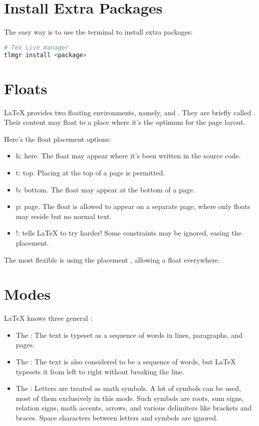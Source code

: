 \section{Install Extra Packages}
\label{sec:inst-extra-pack}

The easy way is to use the terminal to install extra packages:

\begin{lstlisting}[language=sh]
# Tex Live manager
tlmgr install <package>
\end{lstlisting}




\section{Floats}


\LaTeX\xspace provides two floating environments, namely,
 and . They are briefly called
. Their content may float to a place where it's the
optimum for the page layout.


Here's the float placement options:
\begin{itemize}
\item h: here. The float may appear where it's been written in the source code.
\item t: top. Placing at the top of a page is permitted.
\item b: bottom. The float may appear at the bottom of a page.
\item p: page. The float is allowed to appear on a separate page,
  where only floats may reside but no normal text.
\item !: tells LaTeX to try harder! Some constraints may be ignored,
  easing the placement.
\end{itemize}


The most flexible is using the placement \argument{[!htbp]}, allowing a float
everywhere.







\section{Modes}
\label{sec:modes}

LaTeX knows three general :
\begin{itemize}
\item The : The text is typeset as a sequence of words in lines, paragraphs, and pages.
\item The : The text is also considered to be a sequence of words, but LaTeX typesets it from left to right without breaking the line. 
\item The : Letters are treated as math symbols. A lot of symbols can be used, most of them exclusively in this mode. Such symbols are roots, sum signs, relation signs, math accents, arrows, and various delimiters like brackets and braces. Space characters between letters and symbols are ignored. 
\end{itemize}



